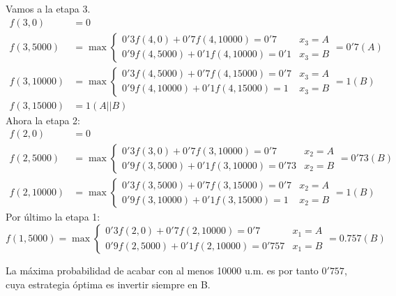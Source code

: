 \documentclass[twoside]{article}
\begin{document}
\begin{solucion}
\begin{enumerate}
Vamos a la etapa 3. 
\begin{align*}
f(3,0)&=0\\
f(3,5000)&=\max\begin{cases}
0'3f(4,0)+0'7f(4,10000)=0'7 & x_3=A\\
0'9f(4,5000)+0'1f(4,10000)=0'1 & x_3=B
\end{cases} = 0'7(A)\\
f(3,10000)&=\max\begin{cases}
0'3f(4,5000)+0'7f(4,15000)=0'7 & x_3=A\\
0'9f(4,10000)+0'1f(4,15000)=1 & x_3=B
\end{cases} = 1(B)\\
f(3,15000) &= 1(A||B)
\end{align*}
Ahora la etapa 2: 
\begin{align*}
f(2,0)&=0\\
f(2,5000)&=\max\begin{cases}
0'3f(3,0)+0'7f(3,10000)=0'7 & x_2=A\\
0'9f(3,5000)+0'1f(3,10000)=0'73 & x_2=B
\end{cases}=0'73(B)\\
f(2,10000)&=\max\begin{cases}
0'3f(3,5000)+0'7f(3,15000)=0'7 & x_2=A\\
0'9f(3,10000)+0'1f(3,15000)=1 & x_2=B
\end{cases} = 1(B)
\end{align*}
Por último la etapa 1:
$$f(1,5000)=\max\begin{cases}
0'3f(2,0)+0'7f(2,10000)=0'7 & x_1=A\\
0'9f(2,5000)+0'1f(2,10000)=0'757 & x_1=B
\end{cases} = 0.757(B)$$

La máxima probabilidad de acabar con al menos 10000 u.m. es por tanto $0'757$, cuya estrategia óptima es invertir siempre en B.
\end{enumerate}
\end{solucion}
\end{document}
